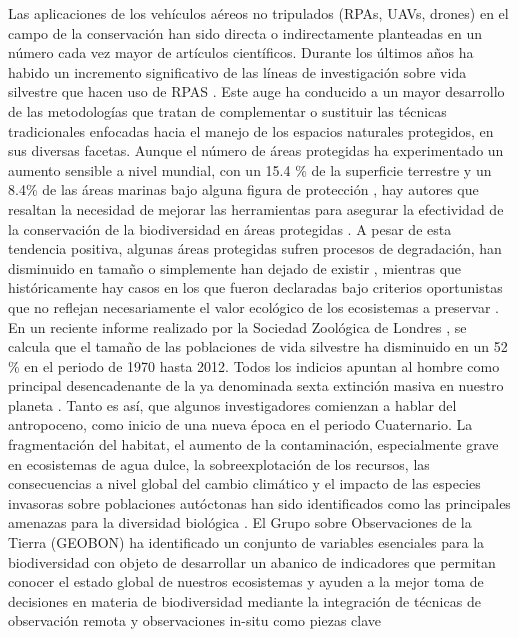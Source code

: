 \documentclass[11pt,]{article}
\begin{document}
Las aplicaciones de los vehículos aéreos no tripulados (RPAs, UAVs,
drones) en el campo de la conservación han sido directa o indirectamente
planteadas en un número cada vez mayor de artículos científicos. Durante
los últimos años ha habido un incremento significativo de las líneas de
investigación sobre vida silvestre que hacen uso de RPAS
\citep{Linchant2015}. Este auge ha conducido a un mayor desarrollo de
las metodologías que tratan de complementar o sustituir las técnicas
tradicionales enfocadas hacia el manejo de los espacios naturales
protegidos, en sus diversas facetas. Aunque el número de áreas
protegidas ha experimentado un aumento sensible a nivel mundial, con un
15.4 \% de la superficie terrestre y un 8.4\% de las áreas marinas bajo
alguna figura de protección \citep{juffe2014protected} , hay autores que
resaltan la necesidad de mejorar las herramientas para asegurar la
efectividad de la conservación de la biodiversidad en áreas protegidas
\citep{Chape2005}. A pesar de esta tendencia positiva, algunas áreas
protegidas sufren procesos de degradación, han disminuido en tamaño o
simplemente han dejado de existir \citep{Mascia2011}, mientras que
históricamente hay casos en los que fueron declaradas bajo criterios
oportunistas que no reflejan necesariamente el valor ecológico de los
ecosistemas a preservar \citep{Knight2007}. En un reciente informe
realizado por la Sociedad Zoológica de Londres \citep{Living2016} , se
calcula que el tamaño de las poblaciones de vida silvestre ha disminuido
en un 52 \% en el periodo de 1970 hasta 2012. Todos los indicios apuntan
al hombre como principal desencadenante de la ya denominada sexta
extinción masiva en nuestro planeta \citep{Barnosky2011}. Tanto es así,
que algunos investigadores comienzan a hablar del antropoceno, como
inicio de una nueva época en el periodo Cuaternario. La fragmentación
del habitat, el aumento de la contaminación, especialmente grave en
ecosistemas de agua dulce, la sobreexplotación de los recursos, las
consecuencias a nivel global del cambio climático y el impacto de las
especies invasoras sobre poblaciones autóctonas han sido identificados
como las principales amenazas para la diversidad biológica . El Grupo
sobre Observaciones de la Tierra (GEOBON) ha identificado un conjunto de
variables esenciales para la biodiversidad \citep{Pereira2013} con
objeto de desarrollar un abanico de indicadores que permitan conocer el
estado global de nuestros ecosistemas y ayuden a la mejor toma de
decisiones en materia de biodiversidad mediante la integración de
técnicas de observación remota y observaciones in-situ como piezas clave
\end{document}
